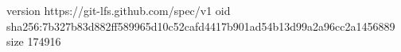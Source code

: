 version https://git-lfs.github.com/spec/v1
oid sha256:7b327b83d882ff589965d10c52cafd4417b901ad54b13d99a2a96cc2a1456889
size 174916
